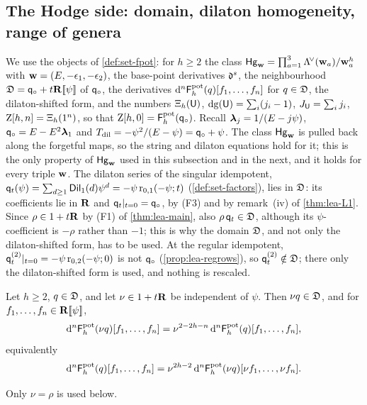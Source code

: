 \subsection{The Hodge side: domain, dilaton homogeneity, range of genera}
\label{sec:reg-hodge}

We use the objects of \cref{def:set-fpot}: for $h\geq 2$ the class $\mathsf{Hg}_{\mathbf{w}}=\prod_{a=1}^3\Lambda^{\!\vee}(\mathbf{w}_a)/\mathbf{w}_a^{h}$ with $\mathbf{w}=(E,-\epsilon_1,-\epsilon_2)$, the base-point derivatives $\mathfrak{d}^s$, the neighbourhood $\mathfrak{D}=\mathsf{q}_{\circ}+t\mathbf{R}[\![ \psi ]\!]$ of $\mathsf{q}_{\circ}$, the derivatives $\mathrm{d}^n\mathsf{F}^{\mathrm{pot}}_h(q)[f_1,\dots,f_n]$ for $q\in\mathfrak{D}$, the dilaton-shifted form, and the numbers $\Xi_h(\mathsf{U})$, $\mathrm{dg}(\mathsf{U})=\sum_i(j_i-1)$, $J_{\mathsf{U}}=\sum_ij_i$, $\mathrm{Z}[h,n]=\Xi_h(1^n)$, so that $\mathrm{Z}[h,0]=\mathsf{F}^{\mathrm{pot}}_h(\mathsf{q}_{\circ})$. Recall $\boldsymbol{\lambda}_j=1/(E-j\psi)$, $\mathsf{q}_{\circ}=E-E^2\boldsymbol{\lambda}_1$ and $T_{\mathrm{dil}}=-\psi^2/(E-\psi)=\mathsf{q}_{\circ}+\psi$. The class $\mathsf{Hg}_{\mathbf{w}}$ is pulled back along the forgetful maps, so the string and dilaton equations hold for it; this is the only property of $\mathsf{Hg}_{\mathbf{w}}$ used in this subsection and in the next, and it holds for every triple $\mathbf{w}$. The dilaton series of the singular idempotent, $\mathsf{q}_{t}(\psi)=\sum_{d\geq 1}\mathsf{Dil}_1(d)\psi^d=-\psi\,\mathrm{r}_{0,1}(-\psi;t)$ (\cref{def:set-factors}), lies in $\mathfrak{D}$: its coefficients lie in $\mathbf{R}$ and $\mathsf{q}_{t}|_{t=0}=\mathsf{q}_{\circ}$, by (F3) and by remark~(iv) of \cref{thm:lea-L1}. Since $\rho\in 1+t\mathbf{R}$ by (F1) of \cref{thm:lea-main}, also $\rho\,\mathsf{q}_{t}\in\mathfrak{D}$, although its $\psi$-coefficient is $-\rho$ rather than $-1$; this is why the domain $\mathfrak{D}$, and not only the dilaton-shifted form, has to be used. At the regular idempotent, $\mathsf{q}_{t}^{(2)}|_{t=0}=-\psi\,\mathrm{r}_{0,2}(-\psi;0)$ is not $\mathsf{q}_{\circ}$ (\cref{prop:lea-regrows}), so $\mathsf{q}_{t}^{(2)}\notin\mathfrak{D}$; there only the dilaton-shifted form is used, and nothing is rescaled.

\begin{lem}
\label{lem:reg-H0}
Let $h\geq 2$, $q\in\mathfrak{D}$, and let $\nu\in 1+t\mathbf{R}$ be independent of $\psi$. Then $\nu q\in\mathfrak{D}$, and for $f_1,\dots,f_n\in\mathbf{R}[\![ \psi ]\!]$,
\[
\mathrm{d}^n\mathsf{F}^{\mathrm{pot}}_h(\nu q)[f_1,\dots,f_n]=\nu^{2-2h-n}\,\mathrm{d}^n\mathsf{F}^{\mathrm{pot}}_h(q)[f_1,\dots,f_n],
\]
equivalently
\begin{equation}
\label{eq:reg-H0}
\mathrm{d}^n\mathsf{F}^{\mathrm{pot}}_h(q)[f_1,\dots,f_n]=\nu^{2h-2}\,\mathrm{d}^n\mathsf{F}^{\mathrm{pot}}_h(\nu q)[\nu f_1,\dots,\nu f_n].
\end{equation}
\end{lem}

Only $\nu=\rho$ is used below.

